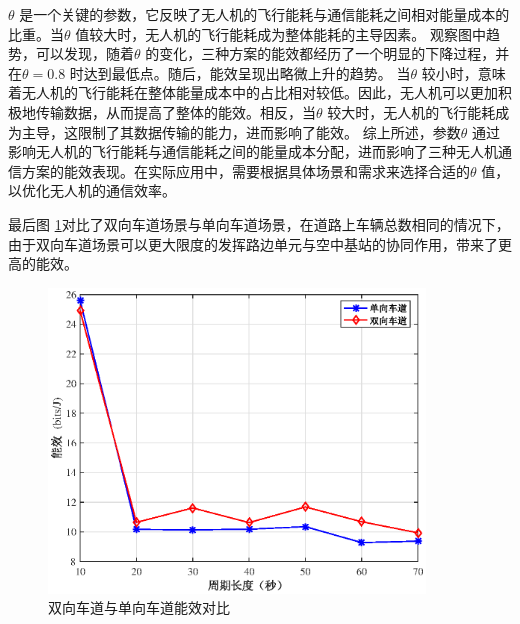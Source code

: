 $\theta$ 是一个关键的参数，它反映了无人机的飞行能耗与通信能耗之间相对能量成本的比重。当$\theta$ 值较大时，无人机的飞行能耗成为整体能耗的主导因素。
观察图中趋势，可以发现，随着$\theta$ 的变化，三种方案的能效都经历了一个明显的下降过程，并在$\theta=0.8$ 时达到最低点。随后，能效呈现出略微上升的趋势。
当$\theta$ 较小时，意味着无人机的飞行能耗在整体能量成本中的占比相对较低。因此，无人机可以更加积极地传输数据，从而提高了整体的能效。相反，当$\theta$ 较大时，无人机的飞行能耗成为主导，这限制了其数据传输的能力，进而影响了能效。
综上所述，参数$\theta$ 通过影响无人机的飞行能耗与通信能耗之间的能量成本分配，进而影响了三种无人机通信方案的能效表现。在实际应用中，需要根据具体场景和需求来选择合适的$\theta$ 值，以优化无人机的通信效率。

最后图 \ref{双向车道与单向车道的对比}对比了双向车道场景与单向车道场景，在道路上车辆总数相同的情况下，由于双向车道场景可以更大限度的发挥路边单元与空中基站的协同作用，带来了更高的能效。
\begin{figure}[H]
\centering
\includegraphics[width=10cm]{figures//chap4//双向车道.eps}
\caption{双向车道与单向车道能效对比}
\label{双向车道与单向车道的对比}
\end{figure}
